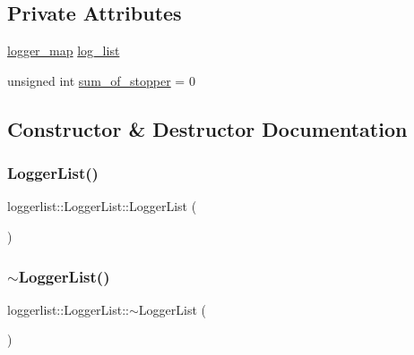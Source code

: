 \subsection*{Private Attributes}
\begin{DoxyCompactItemize}
\item 
\mbox{\hyperlink{loggerlist_8h_afa233b5ec9ffbe76605d913e86d40fe6}{logger\+\_\+map}} \mbox{\hyperlink{classloggerlist_1_1_logger_list_a56997d07c587921a70b0b2c6538ce1f0}{log\+\_\+list}}
\item 
unsigned int \mbox{\hyperlink{classloggerlist_1_1_logger_list_a39c3b4cf8f01c0e29606a9b2537da347}{sum\+\_\+of\+\_\+stopper}} = 0
\end{DoxyCompactItemize}


\subsection{Constructor \& Destructor Documentation}
\mbox{\label{classloggerlist_1_1_logger_list_a67a480c6b56e3e7d79736d4ccef28f63}} 
\subsubsection{\texorpdfstring{Logger\+List()}{LoggerList()}}
{\footnotesize\ttfamily loggerlist\+::\+Logger\+List\+::\+Logger\+List (\begin{DoxyParamCaption}{ }\end{DoxyParamCaption})}

\mbox{\label{classloggerlist_1_1_logger_list_ad63990acf805bf149c3b006790f446c6}} 
\subsubsection{\texorpdfstring{$\sim$\+Logger\+List()}{~LoggerList()}}
{\footnotesize\ttfamily loggerlist\+::\+Logger\+List\+::$\sim$\+Logger\+List (\begin{DoxyParamCaption}{ }\end{DoxyParamCaption})}



